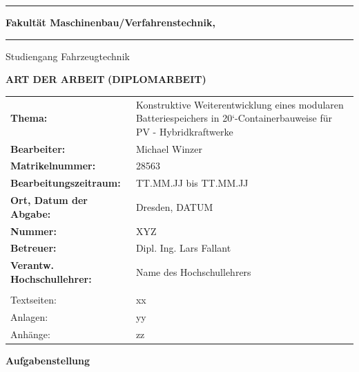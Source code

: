 \documentclass[a4paper, 10pt, titlepage]{scrreprt}
\begin{document}
\begin{titlepage}
\hrule
\vspace{0.2 cm}
\textbf{Fakultät Maschinenbau/Verfahrenstechnik,} 
\vspace{0.1 cm}
\hrule
\vspace{0.2 cm}
Studiengang Fahrzeugtechnik

\begin{center}
\vspace{2 cm}
\huge\textbf{ART DER ARBEIT}
\huge\textbf{(DIPLOMARBEIT)}
\vspace{2 cm}
\end{center}



\begin{tabular}{lL{6,5cm}}
\Large\textbf{Thema:} & \Large{Konstruktive Weiterentwicklung eines modularen Batteriespeichers in 20‘-Containerbauweise für PV - Hybridkraftwerke}\\
\Large\textbf{Bearbeiter:} & \Large{Michael Winzer}\\
\Large\textbf{Matrikelnummer:} & \Large{28563}\\
\Large\textbf{Bearbeitungszeitraum:} & \Large{TT.MM.JJ bis TT.MM.JJ}\\
\Large\textbf{Ort, Datum der Abgabe:} & \Large{Dresden, DATUM}\\
\Large\textbf{Nummer:} & \Large{XYZ}\\
\Large\textbf{Betreuer:} & \Large{Dipl. Ing. Lars Fallant}\\
\Large\textbf{Verantw. Hochschullehrer:} \hspace{1 cm} & \Large{Name des Hochschullehrers}\\
\vspace{1 cm}\\
\large{Textseiten:} & \large{xx}\\
\large{Anlagen:} & \large{yy}\\
\large{Anhänge:} & \large{zz}\\
\end{tabular}


\end{titlepage}
%
\linespread{1.5}

\fancyhf{}

\thispagestyle{fancy}
\Large\textbf{Aufgabenstellung}\\ 
\end{document}
